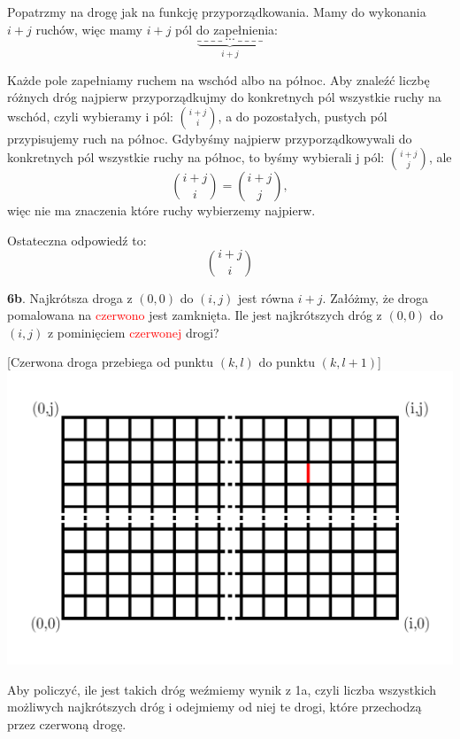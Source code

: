 \documentclass{article}
\begin{document}
Popatrzmy na drogę jak na funkcję przyporządkowania. Mamy do wykonania $i+j$ ruchów, więc mamy $i+j$ pól do zapełnienia:
$$\underbrace{\_\ \_\ \_\ \_\ ...\ \_\ \_\ \_\ \_}_{i+j}$$ 

Każde pole zapełniamy ruchem na wschód albo na północ. Aby znaleźć liczbę różnych dróg najpierw przyporządkujmy do konkretnych pól wszystkie ruchy na wschód, czyli wybieramy i pól: $i+j\choose i$, a do pozostałych, pustych pól przypisujemy ruch na północ. Gdybyśmy najpierw przyporządkowywali do konkretnych pól wszystkie ruchy na północ, to byśmy wybierali j pól: $i+j\choose j$, ale 
$${{i+j}\choose{i} }={ {i+j}\choose{j}},$$
więc nie ma znaczenia które ruchy wybierzemy najpierw. 

Ostateczna odpowiedź to: $${{i+j}\choose{i} }$$

\begin{flushleft}
\large \textbf{6b}. Najkrótsza droga z $(0,0)$ do $(i,j)$ jest równa $i+j$. Załóżmy, że droga pomalowana na \textcolor{red}{czerwono} jest zamknięta. Ile jest najkrótszych dróg z $(0,0)$ do $(i,j)$ z pominięciem \textcolor{red}{czerwonej} drogi?
\end{flushleft}
\begin{center}
[Czerwona droga przebiega od punktu $(k,l)$ do punktu $(k,l+1)$]
\includegraphics[scale=0.17]{path 2.jpg}
\end{center}

Aby policzyć, ile jest takich dróg weźmiemy wynik z 1a, czyli liczba wszystkich możliwych najkrótszych dróg i odejmiemy od niej te drogi, które przechodzą przez czerwoną drogę.
\end{document}
